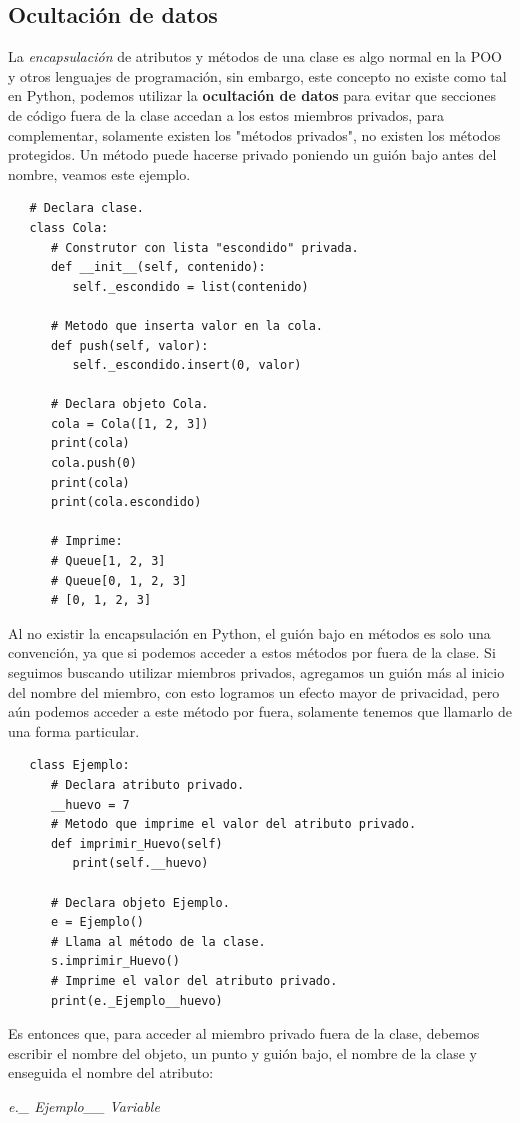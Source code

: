 \subsection{Ocultación de datos}
\hspace{0.55cm}La \textit{encapsulación} de atributos y métodos de una clase es algo normal en la POO y otros lenguajes de programación, sin embargo, este concepto no existe como tal en Python, podemos utilizar la \textbf{ocultación de datos} para evitar que secciones de código fuera de la clase accedan a los estos miembros privados, para complementar, solamente existen los "métodos  privados", no existen los métodos protegidos. Un método puede hacerse privado poniendo un guión bajo antes del nombre, veamos este ejemplo.
\begin{lstlisting}
   # Declara clase.
   class Cola:
      # Construtor con lista "escondido" privada.
      def __init__(self, contenido):
         self._escondido = list(contenido)
      
      # Metodo que inserta valor en la cola.
      def push(self, valor):
         self._escondido.insert(0, valor)
         
      # Declara objeto Cola.
      cola = Cola([1, 2, 3])
      print(cola)
      cola.push(0)
      print(cola)
      print(cola.escondido)
      
      # Imprime:
      # Queue[1, 2, 3]
      # Queue[0, 1, 2, 3]
      # [0, 1, 2, 3]
\end{lstlisting}

Al no existir la encapsulación en Python, el guión bajo en métodos es solo una convención, ya que si podemos acceder a estos métodos por fuera de la clase. Si seguimos buscando utilizar miembros privados, agregamos un guión más al inicio del nombre del miembro, con esto logramos un efecto mayor de privacidad, pero aún podemos acceder a este método por fuera, solamente tenemos que llamarlo de una forma particular.
\begin{lstlisting}
   class Ejemplo:
      # Declara atributo privado.
      __huevo = 7
      # Metodo que imprime el valor del atributo privado.
      def imprimir_Huevo(self)
         print(self.__huevo)
         
      # Declara objeto Ejemplo.
      e = Ejemplo()
      # Llama al método de la clase.
      s.imprimir_Huevo()
      # Imprime el valor del atributo privado.
      print(e._Ejemplo__huevo)
\end{lstlisting}

Es entonces que, para acceder al miembro privado fuera de la clase, debemos escribir el nombre del objeto, un punto y guión bajo, el nombre de la clase y enseguida el nombre del atributo:
\begin{center}
	\textit{e.\_ Ejemplo\_\_ Variable}
\end{center}


